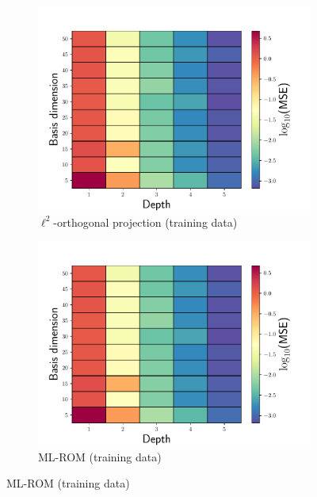 \documentclass[3p,computermodern,10pt]{elsarticle}
\begin{document}
\begin{figure}
\begin{center}
\begin{subfigure}[t]{0.49\textwidth}
\includegraphics[trim={0cm 0cm 0cm 0cm},clip,width=1.0\linewidth]{code/burgers/synapse_models/basis_study/MSE_training.pdf}
\caption{$\ell^2$-orthogonal projection (training data)}
\end{subfigure}
\begin{subfigure}[t]{0.49\textwidth}
\includegraphics[trim={0cm 0cm 0cm 0cm},clip,width=1.0\linewidth]{code/burgers/synapse_models/basis_study/MSE_training.pdf}
\caption{ML-ROM (training data)}
\end{subfigure}

\end{center}
\end{figure}
\end{document}
